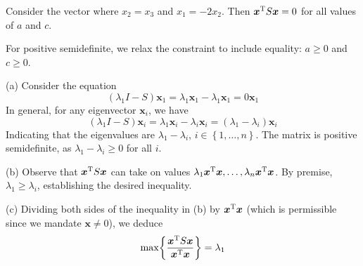 \documentclass[a4paper]{article}
\begin{document}
Consider the vector where \(x_{2} = x_{3}\) and \(x_{1} = -2x_{2}\). Then \(\bm{x}^{\textsc{T}}S \bm{x} = 0\) for all values of \(a\) and \(c\).

For positive semidefinite, we relax the constraint to include equality: \(a \ge 0\) and \(c \ge 0\).

\vspace{12pt}


(a) Consider the equation
\[
	\!\left( \lambda_{1}I - S \right) \bm{x}_{1} = \lambda_{1}\bm{x}_{1} - \lambda_{1} \bm{x}_{1} = 0 \bm{x}_{1}
\]
In general, for any eigenvector \(\bm{x}_{i}\), we have
\[
	\!\left( \lambda_{1}I - S \right) \bm{x}_{i} = \lambda_{1} \bm{x}_{i} - \lambda_{i} \bm{x}_{i} = \!\left( \lambda_{1} - \lambda_{i} \right) \bm{x}_{i}
\]
Indicating that the eigenvalues are \(\lambda_{1} - \lambda_{i}\), \(i \in \!\left\{ 1, \ldots, n \right\} \). The matrix is positive semidefinite, as \(\lambda_{1} - \lambda_{i} \ge 0\) for all \(i\). 

(b) Observe that \(\bm{x}^{\textsc{T}}S \bm{x}\) can take on values \(\lambda_{1}\bm{x}^{\textsc{T}}\bm{x}, \ldots, \lambda_{n}\bm{x}^{\textsc{T}}\bm{x}\). By premise, \(\lambda_{1} \ge \lambda_{i}\), establishing the desired inequality. 

(c) Dividing both sides of the inequality in (b) by \(\bm{x}^{\textsc{T}}\bm{x}\) (which is permissible since we mandate \(\bm{x} \neq 0\)), we deduce
\[
	\max \!\left\{ \frac{\bm{x}^{\textsc{T}}S \bm{x}}{\bm{x}^{\textsc{T}}\bm{x}} \right\} = \lambda_{1}
\]
\end{document}
